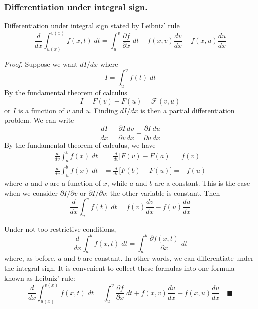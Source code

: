 \documentclass[../../../main.tex]{subfiles}
\begin{document}
\subsubsection{Differentiation under integral sign.} Differentiation under integral sign stated by Leibniz' rule
\begin{equation*}
    \frac{d}{dx}\int_{u(x)}^{v(x)}f(x,t)\;dt=\int_{u}^{v}\frac{\partial f}{\partial x}\;dt + f(x,v)\frac{dv}{dx}-f(x,u)\frac{du}{dx}
\end{equation*}

\emph{Proof.} Suppose we want $dI/dx$ where
\begin{equation*}
    I=\int_{u }^{v }f(t)\;dt
\end{equation*}
By the fundamental theorem of calculus
\begin{equation*}
    I=F(v)-F(u)=\mathcal{F}(v,u)
\end{equation*}
or $I$ is a function of $v$ and $u$. Finding $dI/dx$ is then a partial diﬀerentiation problem. We can write
\begin{equation*}
    \frac{dI}{dx}=\frac{\partial I}{\partial v}\frac{dv}{dx}+\frac{\partial I}{\partial u}\frac{du}{dx}
\end{equation*}
By the fundamental theorem of calculus, we have 
\begin{align*}
    \frac{d}{dv}\int_{a}^{v}f(x)\;dt&=\frac{d}{dv}\bigl[F(v)-F(a)\bigr]=f(v)\\
    \frac{d}{dv}\int_{u}^{b}f(x)\;dt&=\frac{d}{dv}\bigl[F(b)-F(u)\bigr]=-f(u)
\end{align*}
where $u$ and $v$ are a function of $x$, while $a$ and $b$ are a constant. This is the case when we consider $\partial I/\partial v$ or $\partial I/\partial v$; the other variable is constant. Then 
\begin{equation*}
    \frac{d}{dx}\int_{u }^{v }f(t)\;dt=f(v)\frac{dv}{dx}-f(u)\frac{du}{dx}
\end{equation*}

Under not too restrictive conditions, 
\begin{equation*}
    \frac{d}{dx}\int_{a }^{b }f(x,t)\;dt =\int_{a }^{b }\frac{\partial f(x,t)}{\partial x}\;dt
\end{equation*}
where, as before, $a$ and $b$ are constant. In other words, we can differentiate under the integral sign. It is convenient to collect these formulas into one formula known as Leibniz' rule:
\begin{equation*}
    \frac{d}{dx}\int_{u(x)}^{v(x)}f(x,t)\;dt=\int_{u}^{v}\frac{\partial f}{\partial x}\;dt + f(x,v)\frac{dv}{dx}-f(x,u)\frac{du}{dx}\quad\blacksquare
\end{equation*}
\end{document}
